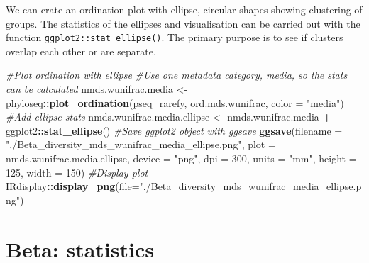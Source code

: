 \documentclass[
]{book}
\newenvironment{Shaded}{\begin{snugshade}}{\end{snugshade}}
\newcommand{\AttributeTok}[1]{\textcolor[rgb]{0.13,0.29,0.53}{#1}}
\newcommand{\CommentTok}[1]{\textcolor[rgb]{0.56,0.35,0.01}{\textit{#1}}}
\newcommand{\DecValTok}[1]{\textcolor[rgb]{0.00,0.00,0.81}{#1}}
\newcommand{\FunctionTok}[1]{\textcolor[rgb]{0.13,0.29,0.53}{\textbf{#1}}}
\newcommand{\NormalTok}[1]{#1}
\newcommand{\OtherTok}[1]{\textcolor[rgb]{0.56,0.35,0.01}{#1}}
\newcommand{\SpecialCharTok}[1]{\textcolor[rgb]{0.81,0.36,0.00}{\textbf{#1}}}
\newcommand{\StringTok}[1]{\textcolor[rgb]{0.31,0.60,0.02}{#1}}
\begin{document}
We can crate an ordination plot with ellipse, circular shapes showing clustering of groups.
The statistics of the ellipses and visualisation can be carried out with the function \texttt{ggplot2::stat\_ellipse()}.
The primary purpose is to see if clusters overlap each other or are separate.

\begin{Shaded}
\begin{Highlighting}[]
\CommentTok{\#Plot ordination with ellipse}
\CommentTok{\#Use one metadata category, media, so the stats can be calculated}
\NormalTok{nmds.wunifrac.media }\OtherTok{\textless{}{-}}\NormalTok{ phyloseq}\SpecialCharTok{::}\FunctionTok{plot\_ordination}\NormalTok{(pseq\_rarefy, ord.mds.wunifrac,}
                                   \AttributeTok{color =} \StringTok{"media"}\NormalTok{)}
\CommentTok{\#Add ellipse stats}
\NormalTok{nmds.wunifrac.media.ellipse }\OtherTok{\textless{}{-}}\NormalTok{ nmds.wunifrac.media }\SpecialCharTok{+}\NormalTok{ ggplot2}\SpecialCharTok{::}\FunctionTok{stat\_ellipse}\NormalTok{()}
\CommentTok{\#Save ggplot2 object with ggsave}
\FunctionTok{ggsave}\NormalTok{(}\AttributeTok{filename =} \StringTok{"./Beta\_diversity\_mds\_wunifrac\_media\_ellipse.png"}\NormalTok{, }\AttributeTok{plot =}\NormalTok{ nmds.wunifrac.media.ellipse,}
       \AttributeTok{device =} \StringTok{"png"}\NormalTok{, }\AttributeTok{dpi =} \DecValTok{300}\NormalTok{, }\AttributeTok{units =} \StringTok{"mm"}\NormalTok{, }\AttributeTok{height =} \DecValTok{125}\NormalTok{, }\AttributeTok{width =} \DecValTok{150}\NormalTok{)}
\CommentTok{\#Display plot}
\NormalTok{IRdisplay}\SpecialCharTok{::}\FunctionTok{display\_png}\NormalTok{(}\AttributeTok{file=}\StringTok{"./Beta\_diversity\_mds\_wunifrac\_media\_ellipse.png"}\NormalTok{)}
\end{Highlighting}
\end{Shaded}

\hypertarget{beta-statistics}{%
\section{Beta: statistics}\label{beta-statistics}}
\end{document}
